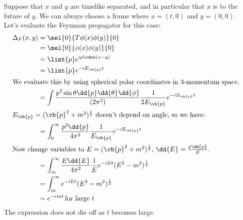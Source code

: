 \documentclass{jknotes} %
\begin{document}
Suppose that \(x\) and \(y\) are timelike separated, and in particular that \(x\) is to the future of \(y\). We can always choose a frame where \(x=(t,0)\) and \(y=(0,0)\). Let's evaluate the Feynman propagator for this case:
\begin{align}
    \Delta_F(x,y) &= \mel{0}{T\phi(x)\phi(y)}{0} \\
    &= \mel{0}{\phi(x)\phi(y)}{0} \\
    &= \lint{p} e^{ip\vdot(x-y)} \\
    &= \lint{p} e^{-iE_{\vb{p}}t} \\
    \intertext{We evaluate this by using spherical polar coordinates in 3-momentum space.}
    &= \int\frac{p^2\sin\theta\dd{p}\dd{\theta}\dd{\phi}}{(2\pi^3)}\frac{1}{2E_{\vb{p}}}e^{-iE_{\vb{p}}t} \\
    \intertext{\(E_{\vb{p}}=(\vb{p}^2+m^2)^{\frac{1}{2}}\) doesn't depend on angle, so we have:}
    &= \int_0^\infty \frac{p^2\dd{p}}{4\pi^2}\frac{1}{E_{\vb{p}}}e^{-iE_{\vb{p}}t}\\
    \intertext{Now change variables to \(E=(\vb{p}^2+m^2)^{\frac{1}{2}}\), \(\dd{E}=\frac{p\dd{p}}{E}\).}
    &= \int_m^\infty \frac{E\dd{E}}{4\pi^2}\frac{1}{E}e^{-iEt} (E^2-m^2)^{\frac{1}{2}} \\
    &= \int_m^\infty e^{-iEt}(E^2-m^2)^{\frac{1}{2}} \\
    &\sim e^{-imt} \,\text{for large \(t\)}
\end{align}
The expression does not die off as \(t\) becomes large.
\end{document}
